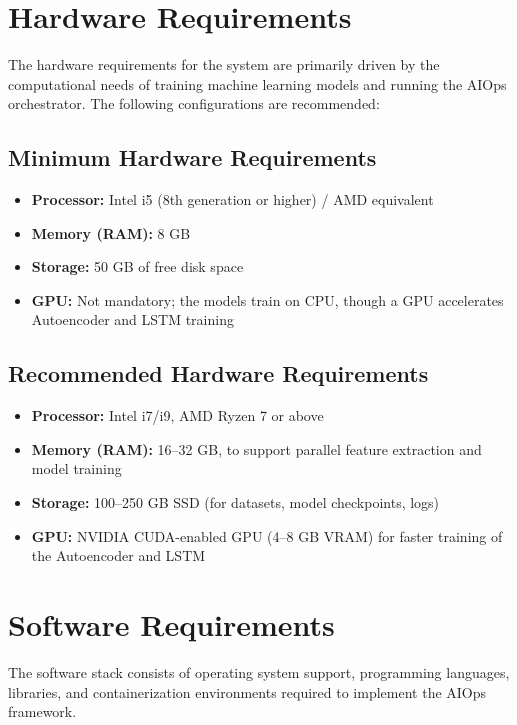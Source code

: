 \documentclass[a4paper,14pt,onecolumn]{report}
\begin{document}
\section{Hardware Requirements}

The hardware requirements for the system are primarily driven by the computational needs of training machine learning models and running the AIOps orchestrator. The following configurations are recommended:

\subsection{Minimum Hardware Requirements}
\begin{itemize}
    \item \textbf{Processor:} Intel i5 (8th generation or higher) / AMD equivalent
    \item \textbf{Memory (RAM):} 8 GB
    \item \textbf{Storage:} 50 GB of free disk space
    \item \textbf{GPU:} Not mandatory; the models train on CPU, though a GPU accelerates Autoencoder and LSTM training
\end{itemize}

\subsection{Recommended Hardware Requirements}
\begin{itemize}
    \item \textbf{Processor:} Intel i7/i9, AMD Ryzen 7 or above
    \item \textbf{Memory (RAM):} 16--32 GB, to support parallel feature extraction and model training
    \item \textbf{Storage:} 100--250 GB SSD (for datasets, model checkpoints, logs)
    \item \textbf{GPU:} NVIDIA CUDA-enabled GPU (4--8 GB VRAM) for faster training of the Autoencoder and LSTM
\end{itemize}

\section{Software Requirements}

The software stack consists of operating system support, programming languages, libraries, and containerization environments required to implement the AIOps framework.
\end{document}
